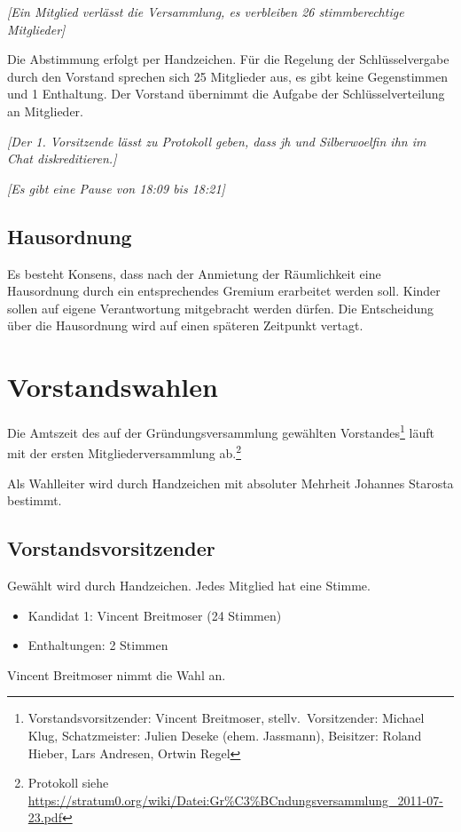\documentclass[a4paper,12pt]{scrartcl}
\begin{document}
\emph{[Ein Mitglied verlässt die Versammlung, es verbleiben 26 stimmberechtige
Mitglieder]}

Die Abstimmung erfolgt per Handzeichen. Für die Regelung der Schlüsselvergabe
durch den Vorstand sprechen sich 25 Mitglieder aus, es gibt keine Gegenstimmen
und 1 Enthaltung. Der Vorstand übernimmt die Aufgabe der Schlüsselverteilung an
Mitglieder.

\emph{[Der 1. Vorsitzende lässt zu Protokoll geben, dass jh und Silberwoelfin
ihn im Chat diskreditieren.]}

\emph{[Es gibt eine Pause von 18:09 bis 18:21]}

\subsection{Hausordnung}
\postponed
Es besteht Konsens, dass nach der Anmietung der Räumlichkeit eine Hausordnung
durch ein entsprechendes Gremium erarbeitet werden soll. Kinder sollen auf
eigene Verantwortung mitgebracht werden dürfen. Die Entscheidung über die
Hausordnung wird auf einen späteren Zeitpunkt vertagt.

\section{Vorstandswahlen}
Die Amtszeit des auf der Gründungsversammlung gewählten Vorstandes\footnote{%
Vorstandsvorsitzender: Vincent Breitmoser, stellv.\ Vorsitzender: Michael Klug,
Schatzmeister: Julien Deseke (ehem. Jassmann), Beisitzer: Roland Hieber, Lars
Andresen, Ortwin Regel} läuft mit der ersten Mitgliederversammlung
ab.\footnote{Protokoll siehe
\url{https://stratum0.org/wiki/Datei:Gr\%C3\%BCndungsversammlung_2011-07-23.pdf}}

Als Wahlleiter wird durch Handzeichen mit absoluter Mehrheit Johannes Starosta
bestimmt.

\subsection{Vorstandsvorsitzender}
Gewählt wird durch Handzeichen. Jedes Mitglied hat eine Stimme.
\begin{itemize}
  \item Kandidat 1: Vincent Breitmoser (24 Stimmen)
  \item Enthaltungen: 2 Stimmen
\end{itemize}
Vincent Breitmoser nimmt die Wahl an.
\end{document}
